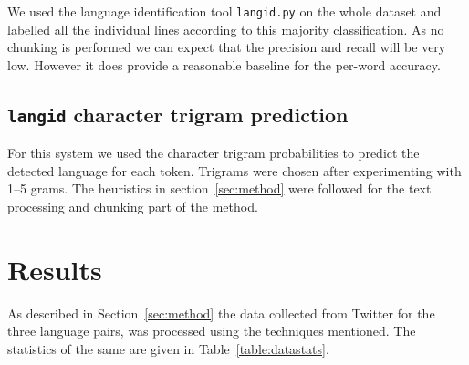 \documentclass[11pt]{article}
\begin{document}
We used the language identification tool \texttt{langid.py} \cite{lui2012langid} on the whole dataset and labelled all the individual lines according to this majority classification. As no chunking is performed we can expect that the precision and recall will be very low. However it does provide a reasonable baseline for the per-word accuracy.  

\subsection{\texttt{langid} character trigram prediction}
\vspace{-0.132cm}
\label{langidstuff}


For this system we used the character trigram probabilities to predict the detected language for each token. Trigrams were chosen after experimenting with 1--5 grams. The heuristics in section~\ref{sec:method} were followed for the text processing and chunking part of the method.

\section{Results}
\label{sec:results}
As described in Section~\ref{sec:method} the data collected from Twitter for the three language pairs, was processed using the techniques mentioned. The statistics of the same are given in Table~\ref{table:datastats}. 
\end{document}
